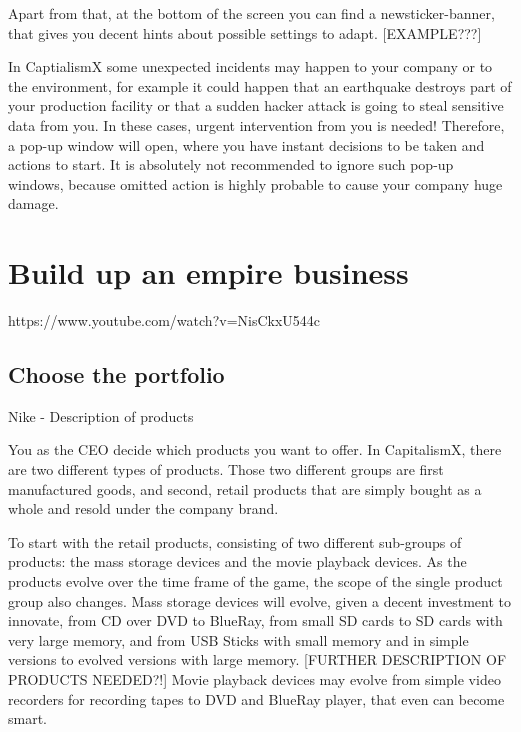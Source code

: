 \documentclass[11pt,titlepage,oneside,openany]{book}
\begin{document}
Apart from that, at the bottom of the screen you can find a newsticker-banner, that gives you decent hints about possible settings to adapt. [EXAMPLE???]%

In CaptialismX some unexpected incidents may happen to your company or to the environment, for example it could happen that an earthquake destroys part of your production facility or that a sudden hacker attack is going to steal sensitive data from you. In these cases, urgent intervention from you is needed! Therefore, a pop-up window will open, where you have instant decisions to be taken and actions to start. It is absolutely not recommended to ignore such pop-up windows, because omitted action is highly probable to cause your company huge damage.


 
%







\section{Build up an empire business}
\label{sec:business}
https://www.youtube.com/watch?v=NisCkxU544c
\subsection{Choose the portfolio}
\label{sub:portfolio}
Nike - Description of products 

You as the CEO decide which products you want to offer. In CapitalismX, there are two different types of products. Those two different groups are first manufactured goods, and second, retail products that are simply bought as a whole and resold under the company brand.

To start with the retail products, consisting of two different sub-groups of products: the mass storage devices and the movie playback devices. As the products evolve over the time frame of the game, the scope of the single product group also changes. Mass storage devices will evolve, given a decent investment to innovate, from CD over DVD to BlueRay, from small SD cards to SD cards with very large memory, and from USB Sticks with small memory and in simple versions to evolved versions with large memory. [FURTHER DESCRIPTION OF PRODUCTS NEEDED?!] Movie playback devices may evolve from simple video recorders for recording tapes to DVD and BlueRay player, that even can become smart. 
\end{document}
